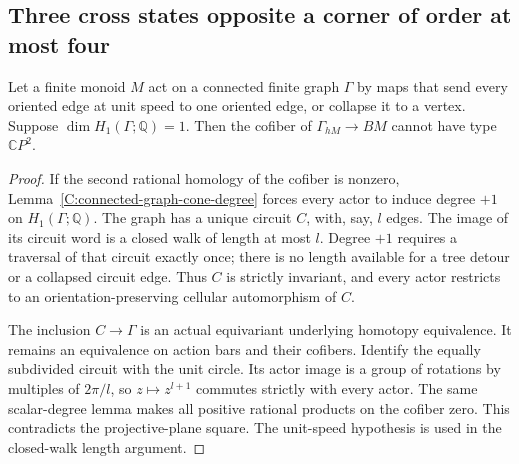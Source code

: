 \subsection{Three cross states opposite a corner of order at most four}

\begin{lemma}
\label{C:unicyclic-graph-correspondence}
Let a finite monoid $M$ act on a connected finite graph $\Gamma$ by
maps that send every oriented edge at unit speed to one oriented edge,
or collapse it to a vertex. Suppose $\dim H_1(\Gamma;\mathbb Q)=1$.
Then the cofiber of $\Gamma_{hM}\to BM$ cannot have type
$\mathbb CP^2$.
\end{lemma}
\begin{proof}
If the second rational homology of the cofiber is nonzero,
Lemma~\ref{C:connected-graph-cone-degree} forces every actor to
induce degree $+1$ on $H_1(\Gamma;\mathbb Q)$.
The graph has a unique circuit $C$, with, say, $l$ edges.
The image of its circuit word is a closed walk of length at most
$l$. Degree $+1$ requires a traversal of that circuit exactly
once; there is no length available for a tree detour or a
collapsed circuit edge. Thus $C$ is strictly invariant, and
every actor restricts to an orientation-preserving cellular
automorphism of $C$.

The inclusion $C\to\Gamma$ is an actual equivariant underlying
homotopy equivalence. It remains an equivalence on action bars
and their cofibers. Identify the equally subdivided circuit with
the unit circle. Its actor image is a group of rotations by
multiples of $2\pi/l$, so $z\mapsto z^{l+1}$ commutes strictly
with every actor. The same scalar-degree lemma makes all positive
rational products on the cofiber zero. This contradicts the
projective-plane square. The unit-speed hypothesis is used in
the closed-walk length argument.
\end{proof}

